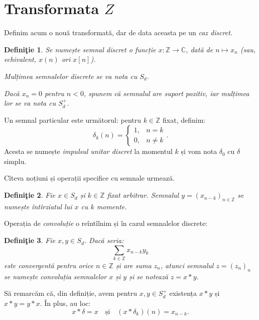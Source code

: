 \documentclass[12pt,a4paper]{article}
\newcommand\ZZ{\mathbb{Z}}
\newcommand\CC{\mathbb{C}}
\theoremstyle{dotless}
\theoremstyle{dotlessdr}
\newtheorem{definition}{Defini\c{t}ie}
\begin{document}

\section*{Transformata $ Z $}

\indent\indent Definim acum o nouă transformată, dar de data aceasta pe un
\emph{caz discret}.

\begin{definition}\label{def:semnal-discret}
  Se numește \emph{semnal discret} o funcție $ x : \ZZ \to \CC $, dată de
  $ n \mapsto x_n $ (sau, echivalent, $ x(n) $ ori $ x[n] $).

  Mulțimea semnalelor discrete se va nota cu $ S_d $.

  Dacă $ x_n = 0 $ pentru $ n < 0 $, spunem că semnalul are \emph{suport pozitiv},
  iar mulțimea lor se va nota cu $ S_d^+ $.
\end{definition}

Un semnal particular este următorul: pentru $ k \in \ZZ $ fixat, definim:
\[
  \delta_k(n) =
  \begin{cases}
    1, & n = k \\
    0, & n \neq k
  \end{cases}.
\]
Acesta se numește \emph{impulsul unitar discret} la momentul $ k $ și vom nota
$ \delta_0 $ cu $ \delta $ simplu.

Cîteva noțiuni și operații specifice cu semnale urmează.

\begin{definition}\label{def:intirziat}
  Fie $ x \in S_d $ și $ k \in \ZZ $ fixat arbitrar. Semnalul $ y = (x_{n-k})_{n \in \ZZ} $
  se numește \emph{întîrziatul} lui $ x $ cu $ k $ momente.
\end{definition}

Operația de \emph{convoluție} o reîntîlnim și în cazul semnalelor discrete:

\begin{definition}\label{def:convolutie}
  Fie $ x, y \in S_d $. Dacă seria:
  \[
    \sum_{k \in \ZZ} x_{n - k} y_k
  \]
  este convergentă pentru orice $ n \in \ZZ $ și are suma $ z_n $, atunci semnalul
  $ z = (z_n)_n $ se numește \emph{convoluția} semnalelor $ x $ și $ y $ și se notează
  $ z = x \ast y $.
\end{definition}

Să remarcăm că, din definiție, avem pentru $ x, y \in S_d^+ $ existența $ x \ast y $
și $ x \ast y = y \ast x $. În plus, au loc:
\[
  x \ast \delta = x \quad \text{și} \quad (x \ast \delta_k)(n) = x_{n - k}.
\]
\end{document}
